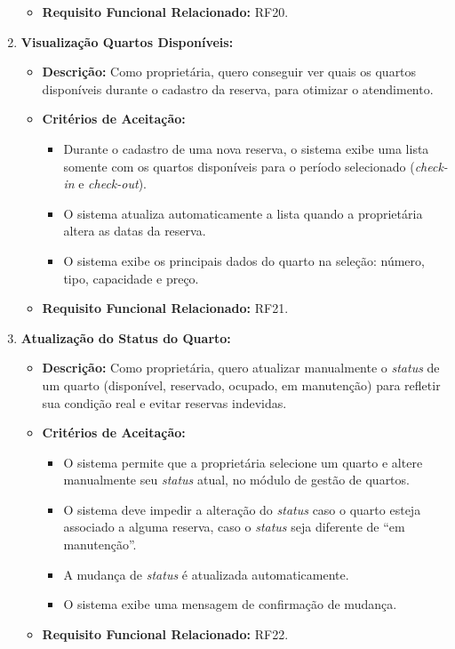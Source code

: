 \documentclass[
	12pt,				%
	openany,			%
	twoside,			%
	a4paper,			%
	english,			%
	french,				%
	spanish,			%
	brazil				%
	]{abntex2}
\begin{document}
\begin{enumerate}[label=\textbf{\arabic*.}]
\begin{itemize}
	 	\item \textbf{Requisito Funcional Relacionado:} RF20.
	 \end{itemize} 
	  \item \textbf{Visualização Quartos Disponíveis:}
	 \begin{itemize}
	 	\item \textbf{Descrição:} Como proprietária, quero conseguir ver quais os quartos disponíveis durante o cadastro da reserva, para otimizar o atendimento.
	 	\item \textbf{Critérios de Aceitação:}
	 	\begin{itemize}
	 		\item Durante o cadastro de uma nova reserva, o sistema exibe uma lista somente com os quartos disponíveis para o período selecionado (\textit{check-in} e \textit{check-out}).
	 		\item O sistema atualiza automaticamente a lista quando a proprietária altera as datas da reserva.
	 		\item O sistema exibe os principais dados do quarto na seleção: número, tipo, capacidade e preço.
	 	\end{itemize}
	 	\item \textbf{Requisito Funcional Relacionado:} RF21.
	 \end{itemize} 
	  \item \textbf{Atualização do Status do Quarto:}
	 \begin{itemize}
	 	\item \textbf{Descrição:} Como proprietária, quero atualizar manualmente o  \textit{status} de um quarto (disponível, reservado, ocupado, em manutenção) para refletir sua condição real e evitar reservas indevidas.
	 	\item \textbf{Critérios de Aceitação:}
	 	\begin{itemize}
	 		\item O sistema permite que a proprietária selecione um quarto e altere manualmente seu  \textit{status} atual, no módulo de gestão de quartos.
	 		\item O sistema deve impedir a alteração do  \textit{status} caso o quarto esteja associado a alguma reserva, caso o  \textit{status} seja diferente de “em manutenção”.
	 		\item A mudança de \textit{status} é atualizada automaticamente.
	 		\item O sistema exibe uma mensagem de confirmação de mudança.
	 	\end{itemize}
	 	\item \textbf{Requisito Funcional Relacionado:} RF22.

\end{itemize}
\end{enumerate}
\end{document}
